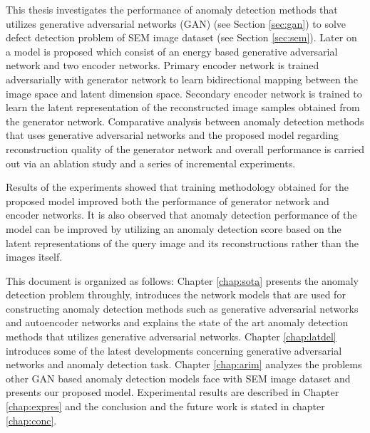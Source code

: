 This thesis investigates the performance of anomaly detection methods that utilizes generative adversarial 
networks (GAN) (see Section \ref{sec:gan}) to solve defect detection problem of SEM image dataset \cite{sem} 
(see Section \ref{sec:sem}). Later on a model is proposed which consist of an energy based generative adversarial 
network and two encoder networks. Primary encoder network is trained adversarially with generator network to 
learn bidirectional mapping between the image space and latent dimension space. Secondary encoder network 
is trained to learn the latent representation of the reconstructed image samples obtained from the generator 
network. Comparative analysis between anomaly detection methods that uses generative adversarial networks and 
the proposed model regarding reconstruction quality of the generator network and overall performance is carried 
out via an ablation study and a series of incremental experiments.

Results of the experiments showed that training methodology obtained for the proposed model improved 
both the performance of generator network and encoder networks. It is also observed that anomaly detection 
performance of the model can be improved by utilizing an anomaly detection score based on the latent representations 
of the query image and its reconstructions rather than the images itself.


This document is organized as follows: Chapter \ref{chap:sota} presents the anomaly detection 
problem throughly, introduces the network models that are used for constructing anomaly 
detection methods such as generative adversarial networks and autoencoder networks and 
explains the state of the art anomaly detection methods that utilizes generative adversarial networks. 
Chapter \ref{chap:latdel} introduces some of the latest developments concerning 
generative adversarial networks and anomaly detection task. Chapter \ref{chap:arim} analyzes the problems 
other GAN based anomaly detection models face with SEM image dataset and presents our proposed model. 
Experimental results are described in Chapter \ref{chap:expres} and the conclusion and 
the future work is stated in chapter \ref{chap:conc}.

\endgroup